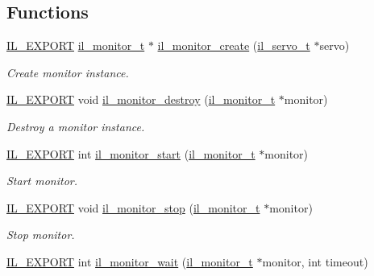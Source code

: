 \subsection*{Functions}
\begin{DoxyCompactItemize}
\item 
\hyperlink{common_8h_a6bb629d26c52bfe10519ba3176853f47}{I\+L\+\_\+\+E\+X\+P\+O\+RT} \hyperlink{group__IL__MONITOR_ga40e12e851c8c83202f0bccbaaafbc1f3}{il\+\_\+monitor\+\_\+t} $\ast$ \hyperlink{group__IL__MONITOR_gabab1b2d47a46eeabfcaa9ec5ce7c49a8}{il\+\_\+monitor\+\_\+create} (\hyperlink{group__IL__SERVO_ga3369ddfcc33492fe3a28f96cf455b13e}{il\+\_\+servo\+\_\+t} $\ast$servo)
\begin{DoxyCompactList}\small\item\em Create monitor instance. \end{DoxyCompactList}\item 
\hyperlink{common_8h_a6bb629d26c52bfe10519ba3176853f47}{I\+L\+\_\+\+E\+X\+P\+O\+RT} void \hyperlink{group__IL__MONITOR_ga3bc1e187d696eadd07a3f33b502c998a}{il\+\_\+monitor\+\_\+destroy} (\hyperlink{group__IL__MONITOR_ga40e12e851c8c83202f0bccbaaafbc1f3}{il\+\_\+monitor\+\_\+t} $\ast$monitor)
\begin{DoxyCompactList}\small\item\em Destroy a monitor instance. \end{DoxyCompactList}\item 
\hyperlink{common_8h_a6bb629d26c52bfe10519ba3176853f47}{I\+L\+\_\+\+E\+X\+P\+O\+RT} int \hyperlink{group__IL__MONITOR_ga41ec8c974f4322537d714844be7b8a2a}{il\+\_\+monitor\+\_\+start} (\hyperlink{group__IL__MONITOR_ga40e12e851c8c83202f0bccbaaafbc1f3}{il\+\_\+monitor\+\_\+t} $\ast$monitor)
\begin{DoxyCompactList}\small\item\em Start monitor. \end{DoxyCompactList}\item 
\hyperlink{common_8h_a6bb629d26c52bfe10519ba3176853f47}{I\+L\+\_\+\+E\+X\+P\+O\+RT} void \hyperlink{group__IL__MONITOR_ga2408490312f9562407f93111a4deece8}{il\+\_\+monitor\+\_\+stop} (\hyperlink{group__IL__MONITOR_ga40e12e851c8c83202f0bccbaaafbc1f3}{il\+\_\+monitor\+\_\+t} $\ast$monitor)
\begin{DoxyCompactList}\small\item\em Stop monitor. \end{DoxyCompactList}\item 
\hyperlink{common_8h_a6bb629d26c52bfe10519ba3176853f47}{I\+L\+\_\+\+E\+X\+P\+O\+RT} int \hyperlink{group__IL__MONITOR_ga5a2bfd4b0f37f4abee986a77afae5b32}{il\+\_\+monitor\+\_\+wait} (\hyperlink{group__IL__MONITOR_ga40e12e851c8c83202f0bccbaaafbc1f3}{il\+\_\+monitor\+\_\+t} $\ast$monitor, int timeout)

\end{DoxyCompactItemize}

